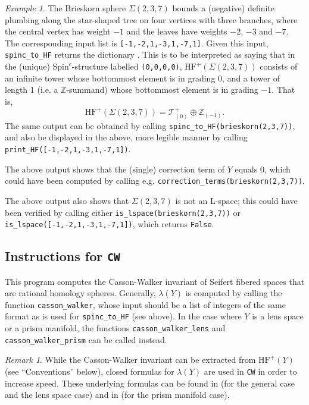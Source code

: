 \documentclass[12pt]{amsart}
\theoremstyle{definition}
\theoremstyle{remark}
\newtheorem*{remark*}{Remark}
\newtheorem*{example*}{Example}
\numberwithin{equation}{section}
\newcommand{\hfp}{\mathrm{HF}^{+}}
\begin{document}
\begin{example*}
The Brieskorn sphere $\Sigma(2,3,7)$ bounds a (negative) definite plumbing along the star-shaped tree on four vertices with three branches, where the central vertex has weight $-1$ and the leaves have weights $-2$, $-3$ and $-7$.
The corresponding input list is \texttt{[-1,-2,1,-3,1,-7,1]}.
Given this input, \texttt{spinc\_to\_HF} returns the dictionary \texttt{}.
This is to be interpreted as saying that in the (unique) $\mathrm{Spin}^{c}$-structure labelled \texttt{(0,0,0,0)}, $\hfp(\Sigma(2,3,7))$ consists of an infinite tower whose bottommost element is in grading $0$, and a tower of length 1 (i.e. a $\mathbb{Z}$-summand) whose bottommost element is in grading $-1$.
That is, \[\hfp(\Sigma(2,3,7)) = \mathcal{T}^{+}_{(0)}\oplus\mathbb{Z}_{(-1)}.\]
The same output can be obtained by calling \texttt{spinc\_to\_HF(brieskorn(2,3,7))}, and also be displayed in the above, more legible manner by calling \texttt{print\_HF([-1,-2,1,-3,1,-7,1])}.

The above output shows that the (single) correction term of $Y$ equals 0, which could have been computed by calling e.g. \texttt{correction\_terms(brieskorn(2,3,7))}.

The above output also shows that $\Sigma(2,3,7)$ is not an L-space; this could have been verified by calling either \texttt{is\_lspace(brieskorn(2,3,7))} or \texttt{is\_lspace([-1,-2,1,-3,1,-7,1])}, which returns \texttt{False}.
\end{example*}

\subsection*{Instructions for \texttt{CW}}

This program computes the Casson-Walker invariant of Seifert fibered spaces that are rational homology spheres.
Generally, $\lambda(Y)$ is computed by calling the function \texttt{casson\_walker}, whose input should be a list of integers of the same format as is used for \texttt{spinc\_to\_HF} (see above).
In the case where $Y$ is a lens space or a prism manifold, the functions \texttt{casson\_walker\_lens} and \texttt{casson\_walker\_prism} can be called instead.

\begin{remark*}
While the Casson-Walker invariant can be extracted from $\hfp(Y)$ (see ``Conventions'' below), closed formulas for $\lambda(Y)$ are used in \texttt{CW} in order to increase speed.
These underlying formulas can be found in \cite[Section 5.3]{Nemethi-Nicolaescu} (for the general case and the lens space case) and in \cite[Section 2.1]{Ballinger_3} (for the prism manifold case).
\end{remark*}
\end{document}
